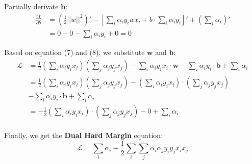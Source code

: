 \documentclass[a4paper,12pt]{article}
\begin{document}
Partially derivate $\textbf{b}$:
\begin{equation}
    \begin{aligned}
        \frac{\partial L}{\partial b} &= (\frac{1}{2}||w||^2)' - \left[\sum_i\alpha_iy_iwx_i + b\cdot\sum_i\alpha_iy_i \right]' + (\sum_i\alpha_i)' \\
        &= 0 - 0 - \sum_i\alpha_iy_i + 0 = 0
    \end{aligned}
\end{equation}

Based on equation (7) and (8), we substitute $\textbf{w}$ and $\textbf{b}$:
\begin{equation}
    \begin{aligned}
        \mathcal{L} &= \frac{1}{2}(\sum_i\alpha_iy_ix_i)(\sum_j\alpha_jy_jx_j) - \sum_i\alpha_iy_ix_i \cdot \textbf{w} -  \sum_i\alpha_iy_i \cdot \textbf{b} + \sum_i\alpha_i \\
        &= \frac{1}{2}(\sum_i\alpha_iy_ix_i)(\sum_j\alpha_jy_jx_j) - (\sum_i\alpha_iy_ix_i) \cdot (\sum_j\alpha_jy_jx_j) \\
        & - \sum_i\alpha_iy_i \cdot \textbf{b} + \sum_i\alpha_i \\
        &= -\frac{1}{2}(\sum_i\alpha_iy_ix_i) \cdot (\sum_j\alpha_jy_jx_j) -  0 + \sum_i\alpha_i \\
    \end{aligned}
\end{equation}

Finally, we get the \textbf{Dual Hard Margin} equation:
\begin{equation}
    \mathcal{L} = \sum_i\alpha_i -\frac{1}{2}\sum_i\sum_j\alpha_i\alpha_jy_iy_jx_ix_j
\end{equation}
\end{document}
